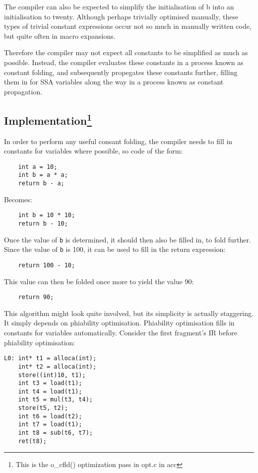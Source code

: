 \documentclass[12pt, a4paper]{article}
\begin{document}
The compiler can also be expected to simplify the initialisation of b into an 
initialisation to twenty. Although perhaps trivially optimised manually, these
types of trivial constant expressions occur not so much in manually written code,
but quite often in macro expansions.

Therefore the compiler may not expect all constants to be simplified as much as
possible. Instead, the compiler evaluates these constants in a process known as 
constant folding, and subsequently propegates these constants further, filling 
them in for SSA variables along the way in a process known as constant 
propagation.

\subsection[Implementation] {Implementation\footnote{This is the o\_cfld() optimization pass in opt.c in acc} }
In order to perform any useful consant folding, the compiler needs to fill in 
constants for variables where possible, so code of the form:

\begin{lstlisting}
	int a = 10;
	int b = a * a;
	return b - a;
\end{lstlisting}

Becomes:

\begin{lstlisting}
	int b = 10 * 10;
	return b - 10;
\end{lstlisting}

Once the value of \verb+b+ is determined, it should then also be filled in, to fold 
further. Since the value of \verb+b+ is 100, it can be used to fill in the return 
expression:

\begin{lstlisting}
	return 100 - 10;
\end{lstlisting}

This value can then be folded once more to yield the value 90:

\begin{lstlisting}
	return 90;
\end{lstlisting}

This algorithm might look quite involved, but its simplicity is actually 
staggering. It simply depends on phiability optimisation. Phiability 
optimisation fills in constants for variables automatically. Consider the first 
fragment's IR before phiability optimisation:

\begin{lstlisting}
L0:	int* t1 = alloca(int);
	int* t2 = alloca(int);
	store((int)10, t1);
	int t3 = load(t1);
	int t4 = load(t1);
	int t5 = mul(t3, t4);
	store(t5, t2);
	int t6 = load(t2);
	int t7 = load(t1);
	int t8 = sub(t6, t7);
	ret(t8);
\end{lstlisting}
\end{document}

